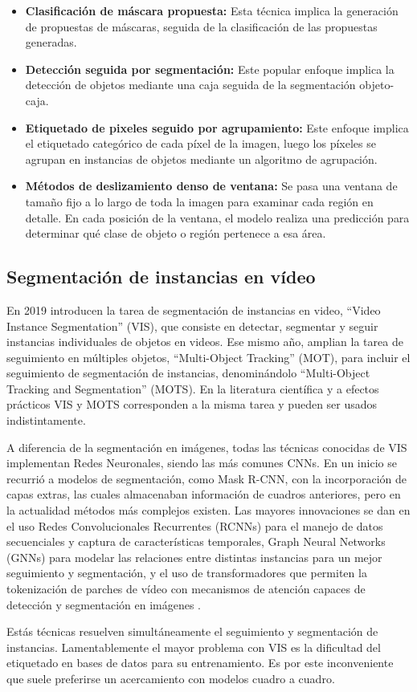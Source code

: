 \begin{itemize}
\setlength\itemsep{-0.3em}
    \item \textbf{Clasificación de máscara propuesta:} Esta técnica implica la generación de propuestas de máscaras, seguida de la clasificación de las propuestas generadas.
    \item \textbf{Detección seguida por segmentación:} Este popular enfoque implica la detección de objetos mediante una caja seguida de la segmentación objeto-caja.
    \item \textbf{Etiquetado de pixeles seguido por agrupamiento:} Este enfoque implica el etiquetado categórico de cada píxel de la imagen, luego los píxeles se agrupan en instancias de objetos mediante un algoritmo de agrupación.
    \item \textbf{Métodos de deslizamiento denso de ventana:} Se pasa una ventana de tamaño fijo a lo largo de toda la imagen para examinar cada región en detalle. En cada posición de la ventana, el modelo realiza una predicción para determinar qué clase de objeto o región pertenece a esa área.
\end{itemize}

\subsection{Segmentación de instancias en vídeo}
En 2019 \cite[Yang et al]{Yang2019} introducen la tarea de segmentación de instancias en video, ``Video Instance Segmentation'' (VIS), que consiste en detectar, segmentar y seguir instancias individuales de objetos en videos. Ese mismo año, \cite[Voigtlaender et al.]{Voigtlaender2019} amplian la tarea de seguimiento en múltiples objetos, ``Multi-Object Tracking'' (MOT), para incluir el seguimiento de segmentación de instancias, denominándolo ``Multi-Object Tracking and Segmentation'' (MOTS). En la literatura científica y a efectos prácticos VIS y MOTS corresponden a la misma tarea y pueden ser usados indistintamente.

A diferencia de la segmentación en imágenes, todas las técnicas conocidas de VIS implementan Redes Neuronales, siendo las más comunes CNNs. En un inicio se recurrió a modelos de segmentación, como Mask R-CNN, con la incorporación de capas extras, las cuales almacenaban información de cuadros anteriores, pero en la actualidad métodos más complejos existen. Las mayores innovaciones se dan en el uso Redes Convolucionales Recurrentes (RCNNs) para el manejo de datos secuenciales y captura de características temporales, Graph Neural Networks (GNNs) para modelar las relaciones entre distintas instancias para un mejor seguimiento y segmentación, y el uso de transformadores que permiten la tokenización de parches de vídeo con mecanismos de atención capaces de detección y segmentación en imágenes \cite{Zhou2023}.

Estás técnicas resuelven simultáneamente el seguimiento y segmentación de instancias. Lamentablemente el mayor problema con VIS es la dificultad del etiquetado en bases de datos para su entrenamiento. Es por este inconveniente que suele preferirse un acercamiento con modelos cuadro a cuadro.
